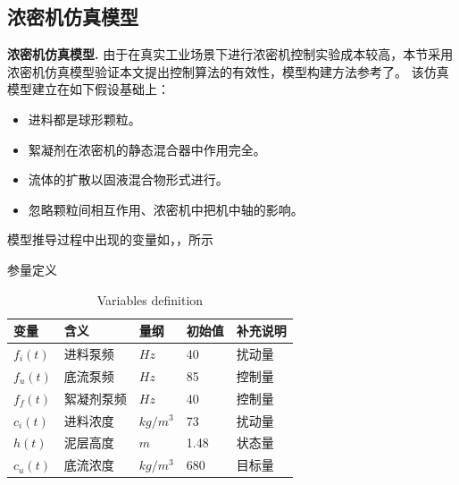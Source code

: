 \subsection{浓密机仿真模型}
{\bf 浓密机仿真模型.}
由于在真实工业场景下进行浓密机控制实验成本较高，本节采用浓密机仿真模型验证本文提出控制算法的有效性，模型构建方法参考了\cite{Chai2016}\cite{KIM2004403}\cite{WangLinyan2017}\cite{WangMeng}\cite{Tang2009}\cite{Wang330}。
该仿真模型建立在如下假设基础上：
\begin{itemize}
    \item 进料都是球形颗粒。
    \item  絮凝剂在浓密机的静态混合器中作用完全。
    \item 流体的扩散以固液混合物形式进行。
    \item 忽略颗粒间相互作用、浓密机中把机中轴的影响。
\end{itemize}
模型推导过程中出现的变量如，，所示
\begin{table}[!ht]
\caption{参量定义} \label{tab:dynamic_variables}


    \addtocounter{table}{-1}
    \vspace{-0.2cm}
    \renewcommand{\tablename}{Table}
    \caption{Variables definition}
    \renewcommand{\tablename}{表}
    \vspace{0.4cm}

\begin{tabular}{@{}lllll@{}}
\toprule
 变量                & 含义     & 量纲       & 初始值  & 补充说明 \\ \midrule
$f_{i}(t)$        & 进料泵频   & $Hz$     & 40   & 扰动量  \\
$f_{u}(t)$        & 底流泵频   & $Hz$     & 85   & 控制量  \\
$f_{f}(t)$        & 絮凝剂泵频  & $Hz$     & 40   & 控制量  \\
$c _ { i } ( t )$ & 进料浓度   & $kg/m^3$ & 73   & 扰动量  \\
$h(t)$            & 泥层高度 & $m$      & 1.48 & 状态量  \\
$c_u(t)$          & 底流浓度   & $kg/m^3$ & 680  & 目标量  \\
\bottomrule
\end{tabular}%

\end{table}

